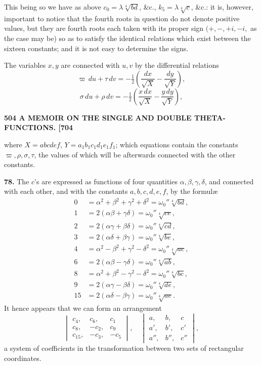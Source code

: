 \documentclass[11pt]{article}
\begin{document}
This being so we have as above $c_0 = \lambda\sqrt[4]{bd}$, \&c., $k_5 = \lambda\sqrt[4]{c}$, \&c.: it is, however, important to notice that the fourth roots in question do not denote positive values, but they are fourth roots each taken with its proper sign $(+, -, +i, -i,$ as the case may be) so as to satisfy the identical relations which exist between the sixteen constants; and it is not easy to determine the signs.

The variables $x,y$ are connected with $u,v$ by the differential relations
\[
\varpi\,du + \tau\,dv = -\tfrac{1}{2}\!\left(\frac{dx}{\sqrt{X}} - \frac{dy}{\sqrt{Y}}\right),
\]
\[
\sigma\,du + \rho\,dv = -\tfrac{1}{2}\!\left(\frac{x\,dx}{\sqrt{X}} - \frac{y\,dy}{\sqrt{Y}}\right),
\]

\bigskip
\noindent\textbf{504 \hfill A MEMOIR ON THE SINGLE AND DOUBLE THETA-FUNCTIONS. \hfill [704}

\medskip
where $X = abcdef$, $Y = a_1 b_1 c_1 d_1 e_1 f_1$; which equations contain the constants $\varpi, \rho, \sigma, \tau$, the values of which will be afterwards connected with the other constants.

\medskip
\textbf{78.} The $c$'s are expressed as functions of four quantities $\alpha, \beta, \gamma, \delta$, and connected with each other, and with the constants $a, b, c, d, e, f$, by the formul\ae
\[
\begin{aligned}
0 &= \alpha^2 + \beta^2 + \gamma^2 + \delta^2 = \omega_0''\sqrt[4]{bd},\\
1 &= 2(\alpha\beta + \gamma\delta) = \omega_0''\sqrt[4]{ce},\\
2 &= 2(\alpha\gamma + \beta\delta) = \omega_0''\sqrt[4]{cd},\\
3 &= 2(\alpha\delta + \beta\gamma) = \omega_0''\sqrt[4]{be},\\
4 &= \alpha^2 - \beta^2 + \gamma^2 - \delta^2 = \omega_0''\sqrt[4]{ac},\\
6 &= 2(\alpha\beta - \gamma\delta) = \omega_0''\sqrt[4]{ab},\\
8 &= \alpha^2 + \beta^2 - \gamma^2 - \delta^2 = \omega_0''\sqrt[4]{bc},\\
9 &= 2(\alpha\gamma - \beta\delta) = \omega_0''\sqrt[4]{de},\\
15 &= 2(\alpha\delta - \beta\gamma) = \omega_0''\sqrt[4]{ae}.
\end{aligned}
\]
It hence appears that we can form an arrangement
\[
\begin{vmatrix} c_4, & c_6, & c_1\\ c_8, & -c_2, & c_9\\ c_{15}, & -c_3, & -c_5 \end{vmatrix},\quad
\begin{vmatrix} a, & b, & c\\ a', & b', & c'\\ a'', & b'', & c'' \end{vmatrix},
\]
a system of coefficients in the transformation between two sets of rectangular coordinates.
\end{document}

